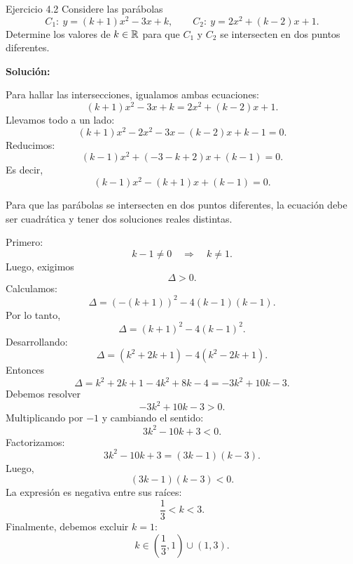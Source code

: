 \documentclass[letterpaper, 12pt]{article}
\begin{document}
\begin{solucionbox}{Ejercicio 4.2}
Considere las par\'abolas
\[
    C_1:\ y=(k+1)x^2-3x+k,
    \qquad
    C_2:\ y=2x^2+(k-2)x+1.
\]
Determine los valores de $k\in\mathbb{R}$ para que $C_1$ y $C_2$ se intersecten en dos puntos diferentes.

\textbf{Soluci\'on:}

Para hallar las intersecciones, igualamos ambas ecuaciones:
\[
    (k+1)x^2-3x+k=2x^2+(k-2)x+1.
\]
Llevamos todo a un lado:
\[
    (k+1)x^2-2x^2-3x-(k-2)x+k-1=0.
\]
Reducimos:
\[
    (k-1)x^2+(-3-k+2)x+(k-1)=0.
\]
Es decir,
\[
    (k-1)x^2-(k+1)x+(k-1)=0.
\]

Para que las par\'abolas se intersecten en dos puntos diferentes, la ecuaci\'on debe ser cuadr\'atica y tener dos soluciones reales distintas.

Primero:
\[
    k-1\neq0
    \quad\Longrightarrow\quad
    k\neq1.
\]
Luego, exigimos
\[
    \Delta>0.
\]
Calculamos:
\[
    \Delta=(-(k+1))^2-4(k-1)(k-1).
\]
Por lo tanto,
\[
    \Delta=(k+1)^2-4(k-1)^2.
\]
Desarrollando:
\[
    \Delta=(k^2+2k+1)-4(k^2-2k+1).
\]
Entonces
\[
    \Delta=k^2+2k+1-4k^2+8k-4
    =-3k^2+10k-3.
\]
Debemos resolver
\[
    -3k^2+10k-3>0.
\]
Multiplicando por $-1$ y cambiando el sentido:
\[
    3k^2-10k+3<0.
\]
Factorizamos:
\[
    3k^2-10k+3=(3k-1)(k-3).
\]
Luego,
\[
    (3k-1)(k-3)<0.
\]
La expresi\'on es negativa entre sus ra\'ices:
\[
    \frac13<k<3.
\]
Finalmente, debemos excluir $k=1$:
\[
    k\in\left(\frac13,1\right)\cup(1,3).
\]

\end{solucionbox}
\end{document}
